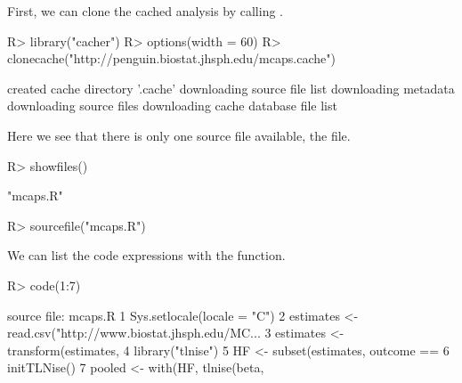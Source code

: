\documentclass[nojss]{jss}
\begin{document}
First, we can clone the cached analysis by calling .
\begin{Schunk}
\begin{Sinput}
R> library("cacher")
R> options(width = 60)
R> clonecache("http://penguin.biostat.jhsph.edu/mcaps.cache")
\end{Sinput}
\begin{Soutput}
created cache directory '.cache'
downloading source file list
downloading metadata
downloading source files
downloading cache database file list
\end{Soutput}
\end{Schunk}
Here we see that there is only one source file available, the
 file.  
\begin{Schunk}
\begin{Sinput}
R> showfiles()
\end{Sinput}
\begin{Soutput}
[1] "mcaps.R"
\end{Soutput}
\begin{Sinput}
R> sourcefile("mcaps.R")
\end{Sinput}
\end{Schunk}
We can list the code expressions with the  function.
\begin{Schunk}
\begin{Sinput}
R> code(1:7)
\end{Sinput}
\begin{Soutput}
source file: mcaps.R
1  Sys.setlocale(locale = "C")
2  estimates <- read.csv("http://www.biostat.jhsph.edu/MC...
3  estimates <- transform(estimates, 
4  library("tlnise")
5  HF <- subset(estimates, outcome == 
6  initTLNise()
7  pooled <- with(HF, tlnise(beta, 
\end{Soutput}
\end{Schunk}
\end{document}
